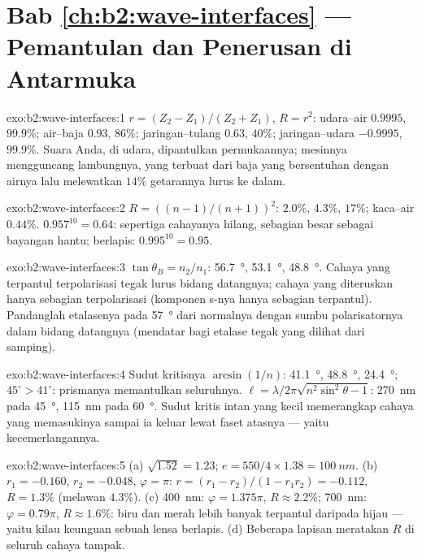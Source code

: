 \section*{Bab \ref{ch:b2:wave-interfaces} --- Pemantulan dan Penerusan di Antarmuka}

\begin{solution}{exo:b2:wave-interfaces:1}
$r = (Z_2 - Z_1)/(Z_2 + Z_1)$, $R = r^2$: udara--air $0.9995$, $99.9\%$;
air--baja $0.93$, $86\%$; jaringan--tulang $0.63$, $40\%$; jaringan--udara
$-0.9995$, $99.9\%$. Suara Anda, di udara, dipantulkan permukaannya;
mesinnya mengguncang lambungnya, yang terbuat dari baja yang bersentuhan dengan airnya lalu
melewatkan $14\%$ getarannya lurus ke dalam.
\end{solution}

\begin{solution}{exo:b2:wave-interfaces:2}
$R = ((n - 1)/(n + 1))^2$: $2.0\%$, $4.3\%$, $17\%$; kaca--air $0.44\%$.
$0.957^{10} = 0.64$: sepertiga cahayanya hilang, sebagian besar sebagai bayangan hantu;
berlapis: $0.995^{10} = 0.95$.
\end{solution}

\begin{solution}{exo:b2:wave-interfaces:3}
$\tan\theta_B = n_2/n_1$: \qty{56.7}{\degree}, \qty{53.1}{\degree}, \qty{48.8}{\degree}. Cahaya
yang terpantul terpolarisasi tegak lurus bidang datangnya;
cahaya yang diteruskan hanya sebagian terpolarisasi (komponen s-nya
hanya sebagian terpantul). Pandanglah etalasenya pada \qty{57}{\degree} dari
normalnya dengan sumbu polarisatornya dalam bidang datangnya (mendatar
bagi etalase tegak yang dilihat dari samping).
\end{solution}

\begin{solution}{exo:b2:wave-interfaces:4}
Sudut kritisnya $\arcsin(1/n)$: \qty{41.1}{\degree}, \qty{48.8}{\degree}, \qty{24.4}{\degree}; $45^\circ > 41^\circ$:
prismanya memantulkan seluruhnya. $\ell = \lambda/2\pi\sqrt{n^2\sin^2\theta - 1}$: \qty{270}{nm}
pada \qty{45}{\degree}, \qty{115}{nm} pada \qty{60}{\degree}. Sudut kritis intan yang kecil
memerangkap cahaya yang memasukinya sampai ia keluar lewat faset atasnya ---
yaitu kecemerlangannya.
\end{solution}

\begin{solution}{exo:b2:wave-interfaces:5}
(a) $\sqrt{1.52} = 1.23$; $e = 550/4 \times 1.38 = \qty{100}{nm}$. (b) $r_1 = -0.160$, $r_2 =
-0.048$, $\varphi = \pi$: $r = (r_1 - r_2)/(1 - r_1r_2) = -0.112$, $R = 1.3\%$ (melawan
$4.3\%$). (c) \qty{400}{nm}: $\varphi = 1.375\pi$, $R \approx 2.2\%$; \qty{700}{nm}: $\varphi =
0.79\pi$, $R \approx 1.6\%$: biru dan merah lebih banyak terpantul daripada hijau ---
yaitu kilau keunguan sebuah lensa berlapis. (d) Beberapa lapisan meratakan $R$
di seluruh cahaya tampak.
\end{solution}

